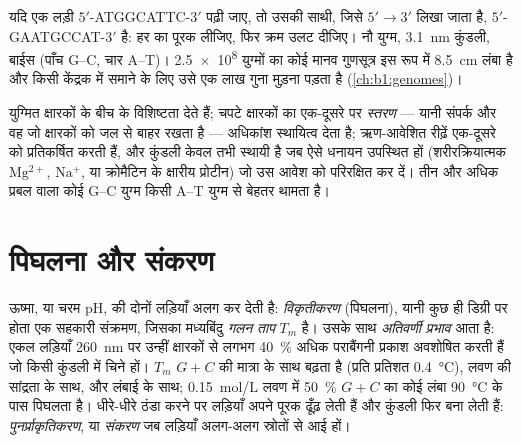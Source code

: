 \begin{example}[किसी लड़ी को पढ़ना]\label{ex:b1:nucleic-acids:complement}
यदि एक लड़ी $5'$-ATGGCATTC-$3'$ पढ़ी जाए, तो उसकी साथी, जिसे
$5' \to 3'$ लिखा जाता है, $5'$-GAATGCCAT-$3'$ है: हर  का पूरक
लीजिए, फिर क्रम उलट दीजिए। नौ युग्म, \qty{3.1}{nm} कुंडली, बाईस
 (पाँच G--C, चार A--T)। \num{2.5e8} युग्मों का कोई मानव
गुणसूत्र इस रूप में \qty{8.5}{cm} लंबा है और किसी केंद्रक में समाने के
लिए उसे एक लाख गुना मुड़ना पड़ता है (\cref{ch:b1:genomes})।
\end{example}

\begin{proposition}[कुंडली को क्या थामे रखता है]\label{prop:b1:nucleic-acids:stability}
युग्मित क्षारकों के बीच के  विशिष्टता देते हैं; चपटे
क्षारकों का एक-दूसरे पर \emph{स्तरण}
--- यानी  संपर्क और वह  जो क्षारकों को जल से
बाहर रखता है --- अधिकांश स्थायित्व देता है; ऋण-आवेशित रीढ़ें एक-दूसरे को
प्रतिकर्षित करती हैं, और कुंडली केवल तभी स्थायी है जब ऐसे धनायन उपस्थित
हों (शरीरक्रियात्मक $\mathrm{Mg^{2+}}$, $\mathrm{Na^+}$, या क्रोमैटिन के
क्षारीय प्रोटीन) जो उस आवेश को परिरक्षित कर दें। तीन  और
अधिक प्रबल  वाला कोई G--C युग्म किसी A--T युग्म से बेहतर थामता है।
\end{proposition}

\section{पिघलना और संकरण}

\begin{definition}\label{def:b1:nucleic-acids:melting}
ऊष्मा, या चरम pH,  की दोनों लड़ियाँ अलग कर देती है:
\emph{विकृतीकरण} (पिघलना), यानी कुछ ही डिग्री पर
होता एक सहकारी संक्रमण, जिसका मध्यबिंदु \emph{गलन
ताप} $T_m$ है। उसके साथ
\emph{अतिवर्णी प्रभाव} आता है: एकल लड़ियाँ \qty{260}{nm} पर उन्हीं
क्षारकों से लगभग \qty{40}{\%} अधिक पराबैंगनी प्रकाश अवशोषित करती हैं जो
किसी कुंडली में चिने हों। $T_m$ $G + C$ की मात्रा के साथ बढ़ता है
(प्रति प्रतिशत \qty{0.4}{\celsius}), लवण की सांद्रता के साथ, और लंबाई के
साथ; \qty{0.15}{mol/L} लवण में \qty{50}{\%} $G + C$ का कोई लंबा 
\qty{90}{\celsius} के पास पिघलता है। धीरे-धीरे ठंडा करने पर लड़ियाँ अपने
पूरक ढूँढ़ लेती हैं और कुंडली फिर बना लेती हैं: \emph{पुनर्प्राकृतिकरण},
या \emph{संकरण} जब लड़ियाँ अलग-अलग स्रोतों से आई हों।
\end{definition}

